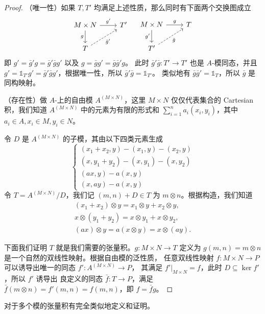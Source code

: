 \begin{proof}
  （唯一性）如果 $T,T'$ 均满足上述性质，那么同时有下面两个交换图成立
  \[
    \begin{tikzcd}
      M\times N\arrow[d,"g"']\arrow[r,"g'"] & T' \\
      T\arrow[ur,dashed,"\bar g'"'] & 
    \end{tikzcd}  \quad
    \begin{tikzcd}
      M\times N\arrow[d,"g'"']\arrow[r,"g"] & T \\
      T'\arrow[ur,dashed,"\bar g"'] & 
    \end{tikzcd}
  \]
  即 $g'=\bar g'g=\bar g'\bar gg'$ 以及 $g=\bar gg'=\bar g\bar g'g$。
  此时 $\bar g'\bar g:T'\to T'$ 也是 $A$-模同态，并且
  $g'=\mathbb{1}_{T'}g'=\bar g'\bar gg'$，根据唯一性，所以 $\bar g'\bar g=\mathbb{1}_{T'}$。
  类似地有 $\bar g\bar g'=\mathbb{1}_T$，所以 $\bar g$ 是同构映射。

  （存在性）做 $A$-上的自由模 $A^{(M\times N)}$，这里 $M\times N$ 仅仅代表集合的
  Cartesian 积，我们知道 $A^{(M\times N)}$ 中的元素为有限的形式和
  $\sum_{i=1}^n a_i(x_i,y_i)$，其中 $a_i\in A,x_i\in M,y_i\in N$。
  
  令 $D$ 是 $A^{(M\times N)}$ 的子模，其由以下四类元素生成
  \[
    \begin{cases}
      (x_1+x_2,y)-(x_1,y)-(x_2,y)\\
      (x,y_1+y_2)-(x,y_1)-(x,y_2)\\
      (ax,y)-a(x,y)\\
      (x,ay)-a(x,y)
    \end{cases}  
  \]
  令 $T=A^{(M\times N)}/D$，我们记 $(m,n)+D\in T$ 为 $m\otimes n$。根据构造，我们知道
  \begin{gather*}
    (x_1+x_2)\otimes y=x_1\otimes y+x_2\otimes y,\\
    x\otimes(y_1+y_2)=x\otimes y_1+x\otimes y_2,\\
    (ax)\otimes y=a(x\otimes y)=x\otimes (ay).
  \end{gather*}
  
  下面我们证明 $T$ 就是我们需要的张量积。$g:M\times N\to T$ 定义为
  $g(m,n)=m\otimes n$ 是一个自然的双线性映射。根据自由模的泛性质，
  任意双线性映射 $f:M\times N\to P$ 可以诱导出唯一的同态 $f':A^{(M\times N)}\to P$，
  其满足 $f'|_{M\times N}=f$，此时 $D\subseteq \ker f'$，所以 $f'$ 诱导出
  良定义的同态 $\bar f:T\to P$，满足 $\bar f(m\otimes n)=f'(m,n)=f(m,n)$，即
  $f=\bar fg$。
\end{proof}

对于多个模的张量积有完全类似地定义和证明。

